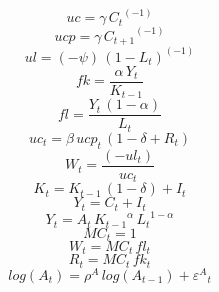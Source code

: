 \begin{dmath*}
uc = {{\gamma}}\, {{C}_{t}}^{\left(-1\right)}
\end{dmath*}
\begin{dmath*}
ucp = {{\gamma}}\, {{C}_{t+1}}^{\left(-1\right)}
\end{dmath*}
\begin{dmath*}
ul = \left(-{{\psi}}\right)\, \left(1-{{L}_{t}}\right)^{\left(-1\right)}
\end{dmath*}
\begin{dmath*}
fk = \frac{{{\alpha}}\, {{Y}_{t}}}{{{K}_{t-1}}}
\end{dmath*}
\begin{dmath*}
fl = \frac{{{Y}_{t}}\, \left(1-{{\alpha}}\right)}{{{L}_{t}}}
\end{dmath*}
\begin{dmath}
{uc_{t}}={{\beta}}\, {ucp_{t}}\, \left(1-{{\delta}}+{{R}_{t}}\right)
\end{dmath}
\begin{dmath}
{{W}_{t}}=\frac{\left(-{ul_{t}}\right)}{{uc_{t}}}
\end{dmath}
\begin{dmath}
{{K}_{t}}={{K}_{t-1}}\, \left(1-{{\delta}}\right)+{{I}_{t}}
\end{dmath}
\begin{dmath}
{{Y}_{t}}={{C}_{t}}+{{I}_{t}}
\end{dmath}
\begin{dmath}
{{Y}_{t}}={{A}_{t}}\, {{K}_{t-1}}^{{{\alpha}}}\, {{L}_{t}}^{1-{{\alpha}}}
\end{dmath}
\begin{dmath}
{{MC}_{t}}=1
\end{dmath}
\begin{dmath}
{{W}_{t}}={{MC}_{t}}\, {fl_{t}}
\end{dmath}
\begin{dmath}
{{R}_{t}}={{MC}_{t}}\, {fk_{t}}
\end{dmath}
\begin{dmath}
log\left({{A}_{t}}\right)={{\rho^A}}\, log\left({{A}_{t-1}}\right)+{{\varepsilon^A}_{t}}
\end{dmath}
